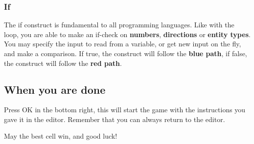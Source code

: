 \subsubsection{If}

The if construct is fundamental to all programming languages. Like with the loop, you are able to make an if-check on \textbf{numbers}, \textbf{directions} or \textbf{entity types}. You may specify the input to read from a variable, or get new input on the fly, and make a comparison. If true, the construct will follow the \textbf{blue path}, if false, the construct will follow the \textbf{red path}.


\subsection{When you are done}

Press OK in the bottom right, this will start the game with the instructions you gave it in the editor. Remember that you can always return to the editor.


May the best cell win, and good luck!
